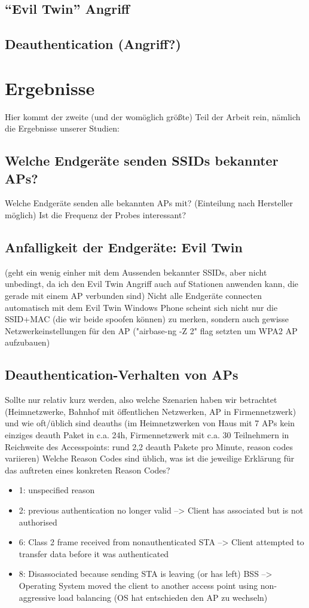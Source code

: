 \documentclass[12pt]{article}
\begin{document}
\subsection{\enquote{Evil Twin} Angriff}

\subsection{Deauthentication (Angriff?)}

\section{Ergebnisse}
Hier kommt der zweite (und der womöglich größte) Teil der Arbeit rein, nämlich die Ergebnisse unserer Studien:

\subsection{Welche Endgeräte senden SSIDs bekannter APs?}
Welche Endgeräte senden alle bekannten APs mit? (Einteilung nach Hersteller möglich)  
Ist die Frequenz der Probes interessant?

\subsection{Anfalligkeit der Endgeräte: Evil Twin}
(geht ein wenig einher mit dem Aussenden bekannter SSIDs, aber nicht unbedingt, da ich den Evil Twin Angriff auch auf Stationen anwenden kann, die gerade mit einem AP verbunden sind)
Nicht alle Endgeräte connecten automatisch mit dem Evil Twin
Windows Phone scheint sich nicht nur die SSID+MAC (die wir beide spoofen können) zu merken, sondern auch gewisse Netzwerkeinstellungen für den AP ("airbase-ng -Z 2" flag setzten um WPA2 AP aufzubauen)

\subsection{Deauthentication-Verhalten von APs}
Sollte nur relativ kurz werden, also welche Szenarien haben wir betrachtet (Heimnetzwerke, Bahnhof mit öffentlichen Netzwerken, AP in Firmennetzwerk) und wie oft/üblich sind deauths (im Heimnetzwerken von Haus mit 7 APs kein einziges deauth Paket in c.a. 24h, Firmennetzwerk mit c.a. 30 Teilnehmern in Reichweite des Accesspoints: rund 2,2 deauth Pakete pro Minute, reason codes variieren)
Welche Reason Codes sind üblich, was ist die jeweilige Erklärung für das auftreten eines konkreten Reason Codes?
\begin{itemize}
	\item 1: unspecified reason 
    \item 2: previous authentication no longer valid --> Client has associated but is not authorised
    \item 6: Class 2 frame received from nonauthenticated STA --> Client attempted to transfer data before it was authenticated
   	\item 8: Disassociated because sending STA is leaving (or has left) BSS --> Operating System moved the client to another access point using non-aggressive load balancing (OS hat entschieden den AP zu wechseln)  
\end{itemize}
\end{document}
